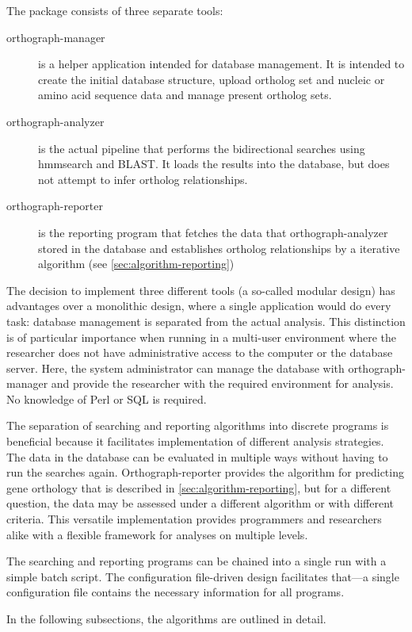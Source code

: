 \label{sec:algorithm}
The \pname package consists of three separate tools:

\begin{description}
	\item[orthograph-manager] is a helper application intended for database
		management. It is intended to create the initial database structure, upload
		ortholog set and nucleic or amino acid sequence data and manage present
		ortholog sets.
	\item[orthograph-analyzer] is the actual pipeline that performs the
		bidirectional searches using hmmsearch and BLAST. It loads the results into
		the database, but does not attempt to infer ortholog relationships. 
	\item[orthograph-reporter] is the reporting program that fetches the data that
		orthograph-analyzer stored in the database and establishes ortholog
		relationships by a iterative algorithm (see
		\autoref{sec:algorithm-reporting})
\end{description}

The decision to implement three different tools (a so-called modular design) has
advantages over a monolithic design, where a single application would do
every task: database management is separated from the actual analysis. This
distinction is of particular importance when running \pname in a multi-user
environment where the researcher does not have administrative access to the
computer or the database server. Here, the system administrator can manage the
database with orthograph-manager and provide the researcher with the required
environment for analysis. No knowledge of Perl or SQL is required.

The separation of searching and reporting algorithms into discrete programs is
beneficial because it facilitates implementation of different analysis
strategies. The data in the database can be evaluated in multiple ways without
having to run the searches again. Orthograph-reporter provides the algorithm for
predicting gene orthology that is described in
\autoref{sec:algorithm-reporting}, but for a different question, the data may be
assessed under a different algorithm or with different criteria. This versatile
implementation provides programmers and researchers alike with a flexible
framework for analyses on multiple levels. 

The searching and reporting programs can be chained into a single run
with a simple batch script. The configuration file-driven design facilitates
that---a single configuration file contains the necessary information for all
\pname programs.

In the following subsections, the algorithms are outlined in detail.
